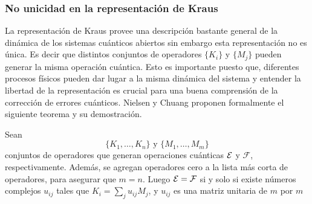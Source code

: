 \subsubsection{No unicidad en la representación de Kraus} %
 La representación de Kraus provee una descripción bastante general de la
dinámica de los sistemas cuánticos abiertos sin embargo esta representación no
es única. Es decir que distintos conjuntos de operadores $\{K_i\}$ y $\{M_j\}$
pueden generar la misma operación cuántica. Esto es importante puesto que,
diferentes procesos físicos pueden dar lugar a la misma dinámica del sistema y
entender la libertad de la representación es crucial para una buena comprensión
de la corrección de errores cuánticos. Nielsen y Chuang
{\cite{nielsen_chuang_2010}} proponen formalmente el siguiente teorema y su demostración.


\begin{theorem}\label{teorema:Libertad_unitaria}
Sean \[\{K_1,\ldots,K_n\} \text{ y } \{M_1,\ldots , M_m\}\] conjuntos de
operadores que generan operaciones cuánticas $\mathcal{E}$ y $\mathcal{F}$,
respectivamente. Además, se agregan operadores cero a la lista más corta de operadores, para asegurar que $m=n$. Luego $\mathcal{E}=\mathcal{F}$
si y solo si existe números complejos $u_{ij}$ tales que $K_i=\sum_j
u_{ij}M_j$, y $u_{ij}$ es una matriz
unitaria de $m$ por $m$
\end{theorem}

